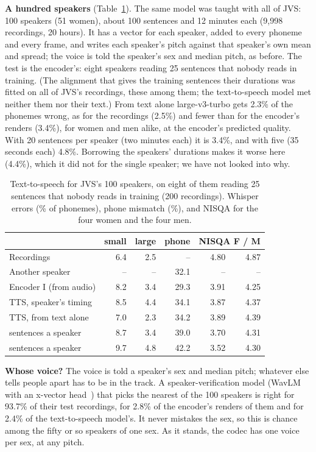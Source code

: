 \documentclass[10pt,a4paper,twocolumn]{article}
\begin{document}
\textbf{A hundred speakers} (Table~\ref{tab:many}). The same model was taught with all of JVS:
100 speakers (51 women), about 100 sentences and 12 minutes each (9,998 recordings, 20 hours). It
has a vector for each speaker, added to every phoneme and every frame, and writes each speaker's
pitch against that speaker's own mean and spread; the voice is told the speaker's sex and median
pitch, as before. The test is the encoder's: eight speakers reading 25 sentences that nobody
reads in training. (The alignment that gives the training sentences their durations was fitted
on all of JVS's recordings, these among them; the text-to-speech model met neither them nor
their text.) From text alone large-v3-turbo gets 2.3\% of the phonemes wrong, as for the
recordings (2.5\%) and fewer than for the encoder's renders (3.4\%), for women and men alike, at
the encoder's predicted quality. With 20 sentences per speaker (two minutes each) it is 3.4\%,
and with five (35 seconds each) 4.8\%. Borrowing the speakers' durations makes it worse here
(4.4\%), which it did not for the single speaker; we have not looked into why.

\begin{table}[t]
\centering\footnotesize\setlength{\tabcolsep}{2.6pt}
\caption{Text-to-speech for JVS's 100 speakers, on eight of them reading 25 sentences that nobody
reads in training (200 recordings). Whisper errors (\% of phonemes), phone mismatch (\%), and
NISQA for the four women and the four men.}
\label{tab:many}
\begin{tabular}{@{}lrrrrr@{}}
\toprule
& small & large & phone & \multicolumn{2}{c}{NISQA F / M}\\
\midrule
Recordings & 6.4 & 2.5 & -- & 4.80 & 4.87\\
Another speaker & -- & -- & 32.1 & -- & --\\
Encoder I (from audio) & 8.2 & 3.4 & 29.3 & 3.91 & 4.25\\
TTS, speaker's timing & 8.5 & 4.4 & 34.1 & 3.87 & 4.37\\
TTS, from text alone & 7.0 & 2.3 & 34.2 & 3.89 & 4.39\\
\quad 20 sentences a speaker & 8.7 & 3.4 & 39.0 & 3.70 & 4.31\\
\quad 5 sentences a speaker & 9.7 & 4.8 & 42.2 & 3.52 & 4.30\\
\bottomrule
\end{tabular}
\end{table}

\textbf{Whose voice?} The voice is told a speaker's sex and median pitch; whatever else tells
people apart has to be in the track. A speaker-verification model (WavLM with an x-vector
head~\cite{wavlm}) that picks the nearest of the 100 speakers is right for 93.7\% of their test
recordings, for 2.8\% of the encoder's renders of them and for 2.4\% of the text-to-speech
model's. It never mistakes the sex, so this is chance among the fifty or so speakers of one sex.
As it stands, the codec has one voice per sex, at any pitch.
\end{document}
